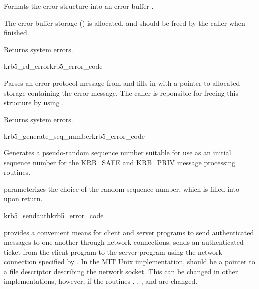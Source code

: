 Formats the error structure  into an error buffer
.

The error buffer storage () is
allocated, and should be freed by the caller when finished.

Returns system errors.

\begin{funcdecl}{krb5_rd_error}{krb5_error_code}{\funcinout}
\funcin
{}
\funcout
{}
\end{funcdecl}

Parses an error protocol message from  and fills in 
 with a pointer to allocated storage containing
the error message.  The caller is reponsible for freeing this structure by
using .

Returns system errors.

\begin{funcdecl}{krb5_generate_seq_number}{krb5_error_code}{\funcinout}
\funcin
{}
\funcout
{}
\end{funcdecl}

Generates a pseudo-random sequence number suitable for use as an initial
sequence number for the KRB_SAFE and KRB_PRIV message processing
routines.

 parameterizes the choice of the random sequence number,
which is filled into  upon return.

\begin{funcdecl}{krb5_sendauth}{krb5_error_code}
\funcinout
{}
\funcin
{}
\funcinout
{}
\funcout
{}
\end{funcdecl}

 provides a convenient means for client and
server programs to send authenticated messages to one another through
network connections.   sends an authenticated
ticket from the client program to the server program using the network
connection specified by .  In the MIT Unix implementation,
 should be a pointer to a file descriptor describing the
network socket.  This can be changed in other implementations, however,
if the routines ,
, , and
 are changed.

